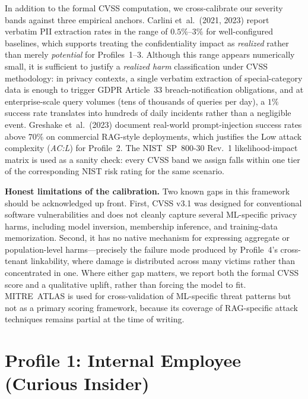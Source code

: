 \documentclass[12pt, a4paper]{report}
\begin{document}
In addition to the formal CVSS computation, we cross-calibrate our
severity bands against three empirical anchors. Carlini et~al.\ (2021,
2023) report verbatim PII extraction rates in the range of
$0.5\%$--$3\%$ for well-configured baselines, which supports treating the
confidentiality impact as \emph{realized} rather than merely
\emph{potential} for Profiles~1--3. Although this range appears
numerically small, it is sufficient to justify a \emph{realized harm}
classification under CVSS methodology: in privacy contexts, a single
verbatim extraction of special-category data is enough to trigger GDPR
Article~33 breach-notification obligations, and at enterprise-scale
query volumes (tens of thousands of queries per day), a $1\%$ success
rate translates into hundreds of daily incidents rather than a
negligible event. Greshake et~al.\ (2023) document real-world
prompt-injection success rates above $70\%$ on commercial RAG-style
deployments, which justifies the Low attack complexity (\emph{AC:L})
for Profile~2. The NIST~SP~800-30 Rev.~1 likelihood-impact matrix is
used as a sanity check: every CVSS band we assign falls within one
tier of the corresponding NIST risk rating for the same scenario.

\begin{limitbox}
\small\textbf{Honest limitations of the calibration.} Two known gaps
in this framework should be acknowledged up front. First, CVSS v3.1
was designed for conventional software vulnerabilities and does not
cleanly capture several ML-specific privacy harms, including model
inversion, membership inference, and training-data memorization.
Second, it has no native mechanism for expressing aggregate or
population-level harms---precisely the failure mode produced by
Profile~4's cross-tenant linkability, where damage is distributed
across many victims rather than concentrated in one. Where either gap
matters, we report both the formal CVSS score and a qualitative
uplift, rather than forcing the model to fit. MITRE~ATLAS is used for
cross-validation of ML-specific threat patterns but not as a primary
scoring framework, because its coverage of RAG-specific attack
techniques remains partial at the time of writing.
\end{limitbox}


\newpage
\section{Profile 1: Internal Employee (Curious Insider)}
\end{document}

